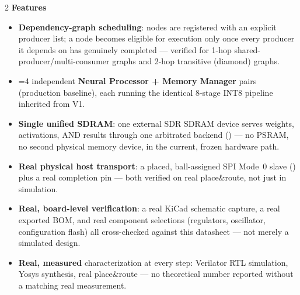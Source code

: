 \vspace{8pt}
\begin{multicols}{2}
{\color{fnDark}\large\bfseries Features}\\[2pt]
{\footnotesize
\begin{itemize}[leftmargin=1.1em]
\item \textbf{Dependency-graph scheduling}: nodes are registered with an
      explicit producer list; a node becomes eligible for execution only
      once every producer it depends on has genuinely completed --- verified
      for 1-hop shared-producer/multi-consumer graphs and 2-hop transitive
      (diamond) graphs.
\item {}=4 independent \textbf{Neural Processor + Memory
      Manager} pairs (production baseline), each running the identical
      8-stage INT8 pipeline inherited from V1.
\item \textbf{Single unified SDRAM}: one external SDR SDRAM device serves
      weights, activations, AND results through one arbitrated backend
      () --- no PSRAM, no second physical
      memory device, in the current, frozen hardware path.
\item \textbf{Real physical host transport}: a placed, ball-assigned SPI
      Mode~0 slave () plus a real
       completion pin --- both verified on real
       place\&route, not just in simulation.
\item \textbf{Real, board-level verification}: a real KiCad schematic
      capture, a real exported BOM, and real component selections
      (regulators, oscillator, configuration flash) all cross-checked
      against this datasheet --- not merely a simulated design.
\item \textbf{Real, measured} characterization at every step: Verilator
      RTL simulation, Yosys synthesis, real 
      place\&route --- no theoretical number reported without a matching
      real measurement.
\end{itemize}}

\columnbreak


\end{multicols}
